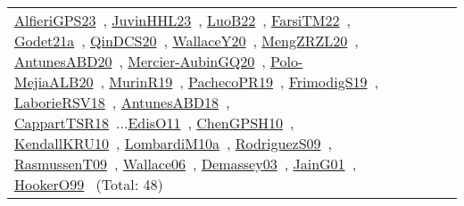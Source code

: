 {\begin{longtable}{p{3cm}r>{\raggedright\arraybackslash}p{6cm}>{\raggedright\arraybackslash}p{6cm}>{\raggedright\arraybackslash}p{8cm}}
\href{../works/AlfieriGPS23.pdf}{AlfieriGPS23}~\cite{AlfieriGPS23}, \href{../works/JuvinHHL23.pdf}{JuvinHHL23}~\cite{JuvinHHL23}, \href{../works/LuoB22.pdf}{LuoB22}~\cite{LuoB22}, \href{../works/FarsiTM22.pdf}{FarsiTM22}~\cite{FarsiTM22}, \href{../works/Godet21a.pdf}{Godet21a}~\cite{Godet21a}, \href{../works/QinDCS20.pdf}{QinDCS20}~\cite{QinDCS20}, \href{../works/WallaceY20.pdf}{WallaceY20}~\cite{WallaceY20}, \href{../works/MengZRZL20.pdf}{MengZRZL20}~\cite{MengZRZL20}, \href{../works/AntunesABD20.pdf}{AntunesABD20}~\cite{AntunesABD20}, \href{../works/Mercier-AubinGQ20.pdf}{Mercier-AubinGQ20}~\cite{Mercier-AubinGQ20}, \href{../works/Polo-MejiaALB20.pdf}{Polo-MejiaALB20}~\cite{Polo-MejiaALB20}, \href{../works/MurinR19.pdf}{MurinR19}~\cite{MurinR19}, \href{../works/PachecoPR19.pdf}{PachecoPR19}~\cite{PachecoPR19}, \href{../works/FrimodigS19.pdf}{FrimodigS19}~\cite{FrimodigS19}, \href{../works/LaborieRSV18.pdf}{LaborieRSV18}~\cite{LaborieRSV18}, \href{../works/AntunesABD18.pdf}{AntunesABD18}~\cite{AntunesABD18}, \href{../works/CappartTSR18.pdf}{CappartTSR18}~\cite{CappartTSR18}...\href{../works/EdisO11.pdf}{EdisO11}~\cite{EdisO11}, \href{../works/ChenGPSH10.pdf}{ChenGPSH10}~\cite{ChenGPSH10}, \href{../works/KendallKRU10.pdf}{KendallKRU10}~\cite{KendallKRU10}, \href{../works/LombardiM10a.pdf}{LombardiM10a}~\cite{LombardiM10a}, \href{../works/RodriguezS09.pdf}{RodriguezS09}~\cite{RodriguezS09}, \href{../works/RasmussenT09.pdf}{RasmussenT09}~\cite{RasmussenT09}, \href{../works/Wallace06.pdf}{Wallace06}~\cite{Wallace06}, \href{../works/Demassey03.pdf}{Demassey03}~\cite{Demassey03}, \href{../works/JainG01.pdf}{JainG01}~\cite{JainG01}, \href{../works/HookerO99.pdf}{HookerO99}~\cite{HookerO99} (Total: 48)\\

\end{longtable}}
